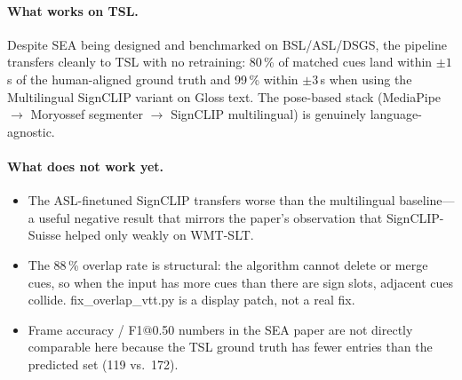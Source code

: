 \documentclass[11pt,a4paper]{article}
\def\texttt#1{#1}%
\def\emph#1{#1}%
\begin{document}
\paragraph{What works on TSL.} Despite SEA being designed and benchmarked on
BSL/ASL/DSGS, the pipeline transfers cleanly to TSL with no retraining: 80\,\%
of matched cues land within $\pm 1\,$s of the human-aligned ground truth and
99\,\% within $\pm 3\,$s when using the Multilingual SignCLIP variant on
Gloss text. The pose-based stack (MediaPipe $\to$ Moryossef segmenter $\to$
SignCLIP multilingual) is genuinely language-agnostic.

\paragraph{What does \emph{not} work yet.}
\begin{itemize}[leftmargin=1.5em]
  \item The ASL-finetuned SignCLIP transfers \emph{worse} than the
        multilingual baseline---a useful negative result that mirrors the
        paper's observation that SignCLIP-Suisse helped only weakly on
        WMT-SLT.
  \item The 88\,\% overlap rate is structural: the algorithm cannot delete
        or merge cues, so when the input has more cues than there are sign
        slots, adjacent cues collide. \texttt{fix\_overlap\_vtt.py} is a
        display patch, not a real fix.
  \item Frame accuracy / F1@0.50 numbers in the SEA paper are not directly
        comparable here because the TSL ground truth has fewer entries than
        the predicted set (119 vs.\ 172).
\end{itemize}
\end{document}
